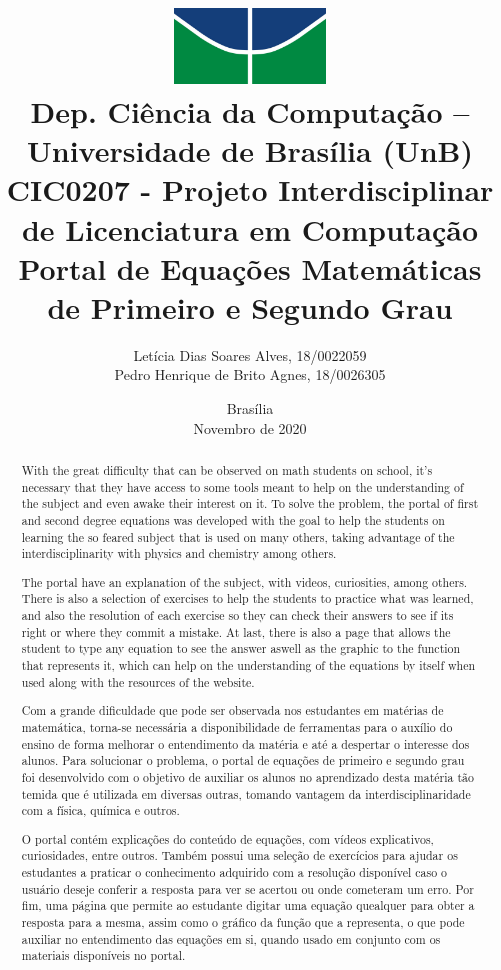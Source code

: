 \documentclass[12pt]{report}
\title{
        \includegraphics[width=4cm]{img/logo.jpg} \\ 
        \large
        Dep. Ciência da Computação -- Universidade de Brasília (UnB)\\
        CIC0207 - Projeto Interdisciplinar de Licenciatura em Computação \\
        \vfill 
        \vfill
        \LARGE
        \textbf{Portal de Equações Matemáticas de Primeiro e Segundo Grau}
    }
\author{
        Letícia Dias Soares Alves, 18/0022059\\
        Pedro Henrique de Brito Agnes, 18/0026305
    }
\affil{
        \vfill
        \vfill
        \vfill
        Professora \\
        Dr.a Letícia Lopes Leite
    }
\date{Brasília\\Novembro de 2020}
\begin{document}
\maketitle

\begin{abstract}
  With the great difficulty that can be observed on math students on school, it's necessary that they have access to some tools meant to help on the understanding of the subject and even awake their interest on it. To solve the problem, the portal of first and second degree equations was developed with the goal to help the students on learning the so feared subject that is used on many others, taking advantage of the interdisciplinarity with physics and chemistry among others.

  The portal have an explanation of the subject, with videos, curiosities, among others. There is also a selection of exercises to help the students to practice what was learned, and also the resolution of each exercise so they can check their answers to see if its right or where they commit a mistake. At last, there is also a page that allows the student to type any equation to see the answer aswell as the graphic to the function that represents it, which can help on the understanding of the equations by itself when used along with the resources of the website.
\end{abstract}

\begin{abstract}
  Com a grande dificuldade que pode ser observada nos estudantes em matérias de matemática, torna-se necessária a disponibilidade de ferramentas para o auxílio do ensino de forma melhorar o entendimento da matéria e até a despertar o interesse dos alunos. Para solucionar o problema, o portal de equações de primeiro e segundo grau foi desenvolvido com o objetivo de auxiliar os alunos no aprendizado desta matéria tão temida que é utilizada em diversas outras, tomando vantagem da interdisciplinaridade com a física, química e outros.

  O portal contém explicações do conteúdo de equações, com vídeos explicativos, curiosidades, entre outros. Também possui uma seleção de exercícios para ajudar os estudantes a praticar o conhecimento adquirido com a resolução disponível caso o usuário deseje conferir a resposta para ver se acertou ou onde cometeram um erro. Por fim, uma página que permite ao estudante digitar uma equação quealquer para obter a resposta para a mesma, assim como o gráfico da função que a representa, o que pode auxiliar no entendimento das equações em si, quando usado em conjunto com os materiais disponíveis no portal.
\end{abstract}
\end{document}
